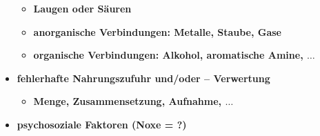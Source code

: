 \begin{itemize}
\begin{itemize}
				\item \textbf{Laugen oder Säuren}
				\item \textbf{anorganische Verbindungen: Metalle, Staube, Gase}
				\item \textbf{organische Verbindungen: Alkohol, aromatische Amine, $\dots$}
			\end{itemize}
		\item \textbf{fehlerhafte Nahrungszufuhr und/oder – Verwertung}
			\begin{itemize}
				\item \textbf{Menge, Zusammensetzung, Aufnahme, $\dots$}
			\end{itemize}
		\item \textbf{psychosoziale Faktoren (Noxe = ?)}
	\end{itemize}

